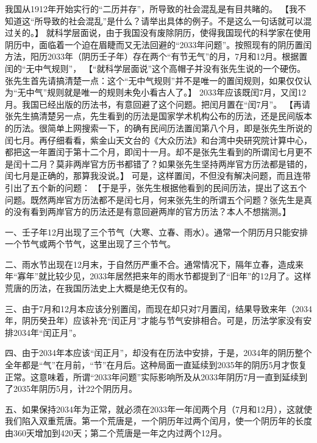 \fangsong
我国从1912年开始实行的“二历并存”，所导致的社会混乱是有目共睹的。
\normalfont
【我不知道这“所导致的社会混乱”是什么？请举出具体的例子。不是这么一句话就可以混过关的。】
\fangsong
就科学层面说，由于我国没有废除阴历，使得我国现代的科学家在使用阴历中，面临着一个迫在眉睫而又无法回避的“2033年问题”。按照现有的阴历置闰方法，阳历2033年（阴历壬子年）存在两个“有节无气”的月，7月和12月。根据置闰的“无中气规则”，
\normalfont
【“就科学层面说”这个高帽子并没有张先生说的一个硬伤。张先生首先请搞清楚一点：这个“无中气规则”并不是唯一的置闰规则，如果仅仅认为“无中气”规则就是唯一的规则未免小看古人了。】
\fangsong
2033年应该既闰7月，又闰12月。我国已经出版的历法书，有意回避了这个问题。把闰月置在“闰7月”。
\normalfont
【再请张先生搞清楚另一点，先生看到的历法是国家学术机构公布的历法，还是民间版本的历法。很简单上网搜索一下，的确有民间历法置闰第八个月，即是张先生所说的闰七月。再仔细看看，紫金山天文台的《大众历法》和台湾中央研究院计算中心，都把这一年置闰于第十二个月，即闰十一月。却不是张先生看到的所谓闰七月更不是闰十二月？莫非两岸官方历书都错了？如果张先生坚持两岸官方历法都是错的，闰七月是正确的，那算我没说。】
\fangsong
可是，这样置闰，不但没有解决问题，而且连带引出了五个新的问题：
\normalfont【于是乎，张先生根据他看到的民间历法，提出了这五个问题。既然两岸官方历法都不是闰七月，何来张先生的所谓五个问题？张先生是真的没有看到两岸官方的历法还是有意回避两岸的官方历法？本人不想揣测。】\fangsong

一、壬子年12月出现了三个节气（大寒、立春、雨水）。通常一个阴历月只能安排一个节气或两个节气，这里出现了三个节气。

二、雨水节出现在12月末，于自然历严重不合。通常情况下，隔年立春，造成来年“寡年”就比较少见，2033年居然把来年的雨水节都提到了“旧年”的12月了。这样荒唐的历法，在我国历法史上大概是绝无仅有的。

三、由于7月和12月本应该分别置闰，而现在却只对7月置闰，结果导致来年（2034年，阴历癸丑年）应该补充“闰正月”才能与节气安排相合。可是，历法学家没有安排2034年“闰正月”。

四、由于2034年本应该“闰正月”，却没有在历法中安排，于是，2034年的阴历整个全年都是“气”在月前，“节”在月后。这种局面一直延续到2035年的阴历5月才恢复正常。这意味着，所谓“2033年问题”实际影响所及从2033年阴历7月一直到延续到了2035年阴历5月，计22个阴历月。

五、如果保持2034年为正常，就必须在2033年一年闰两个月（7月和12月），这就使我们陷入双重荒唐。第一个荒唐是，一个阴历年过两个闰月，使一个阴历年的长度由360天增加到420天；第二个荒唐是一年之内过两个12月。

